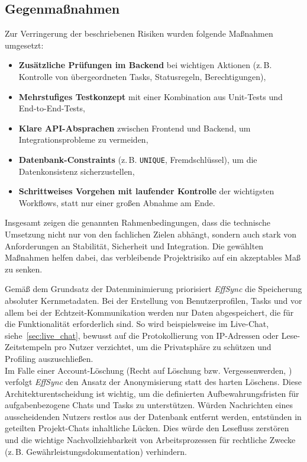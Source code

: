\subsection{Gegenmaßnahmen}
Zur Verringerung der beschriebenen Risiken wurden folgende Maßnahmen umgesetzt:
\begin{itemize}
   \item \textbf{Zusätzliche Prüfungen im Backend} bei wichtigen Aktionen (z.\,B. Kontrolle von übergeordneten Tasks, Statusregeln, Berechtigungen),
   \item \textbf{Mehrstufiges Testkonzept} mit einer Kombination aus Unit-Tests und End-to-End-Tests,
   \item \textbf{Klare API-Absprachen} zwischen Frontend und Backend, um Integrationsprobleme zu vermeiden,
   \item \textbf{Datenbank-Constraints} (z.\,B. \texttt{UNIQUE}, Fremdschlüssel), um die Datenkonsistenz sicherzustellen,
   \item \textbf{Schrittweises Vorgehen mit laufender Kontrolle} der wichtigsten Workflows, statt nur einer großen Abnahme am Ende.
\end{itemize}

Insgesamt zeigen die genannten Rahmenbedingungen, dass die technische Umsetzung nicht nur von den fachlichen Zielen abhängt, sondern auch stark von Anforderungen an Stabilität, Sicherheit und Integration. Die gewählten Maßnahmen helfen dabei, das verbleibende Projektrisiko auf ein akzeptables Maß zu senken.
 
\label{sec:dsgvo}
Gemäß dem Grundsatz der Datenminimierung \cite[Art.~5 Abs.~1 lit.~c]{dsgvo2016} priorisiert \textit{EffSync} die Speicherung absoluter Kernmetadaten. Bei der Erstellung von Benutzerprofilen, Tasks und vor allem bei der Echtzeit-Kommunikation werden nur Daten abgespeichert, die für die Funktionalität erforderlich sind. So wird beispielsweise im Live-Chat, siehe~\autoref{sec:live_chat}, bewusst auf die Protokollierung von IP-Adressen oder Lese-Zeitstempeln pro Nutzer verzichtet, um die Privatsphäre zu schützen und Profiling auszuschließen.\\
 
Im Falle einer Account-Löschung (Recht auf Löschung bzw. Vergessenwerden, \cite[Art.~17]{dsgvo2016}) verfolgt \textit{EffSync} den Ansatz der Anonymisierung statt des harten Löschens. Diese Architekturentscheidung ist wichtig, um die definierten Aufbewahrungsfristen für aufgabenbezogene Chats und Tasks zu unterstützen. Würden Nachrichten eines ausscheidenden Nutzers restlos aus der Datenbank entfernt werden, entstünden in geteilten Projekt-Chats inhaltliche Lücken. Dies würde den Lesefluss zerstören und die wichtige Nachvollziehbarkeit von Arbeitsprozessen für rechtliche Zwecke (z.\,B. Gewährleistungsdokumentation) verhindern.\\
 
